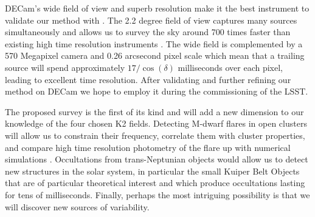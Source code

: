 \documentclass[11pt]{article}
\begin{document}
DECam's wide field of view and superb resolution make it the best instrument to validate our method with \citep{2015AJ....150..150F}. The 2.2 degree field of view captures many sources simultaneously and allows us to survey the sky around 700 times faster than existing high time resolution instruments \citep{2007MNRAS.378..825D}. The wide field is complemented by a 570 Megapixel camera and 0.26 arcsecond pixel scale which mean that a trailing source will spend approximately $17 / \cos(\delta)$ milliseconds over each pixel, leading to excellent time resolution. After validating and further refining our method on DECam we hope to employ it during the commissioning of the LSST. 

The proposed survey is the first of its kind and will add a new dimension to our knowledge of the four chosen K2 fields. Detecting M-dwarf flares in open clusters will allow us to constrain their frequency, correlate them with cluster properties, and compare high time resolution photometry of the flare up with numerical simulations \citep{}. Occultations from trans-Neptunian objects would allow us to detect new structures in the solar system, in particular the small Kuiper Belt Objects that are of particular theoretical interest and which produce occultations lasting for tens of milliseconds. Finally, perhaps the most intriguing possibility is that we will discover new sources of variability. 







\end{document}
